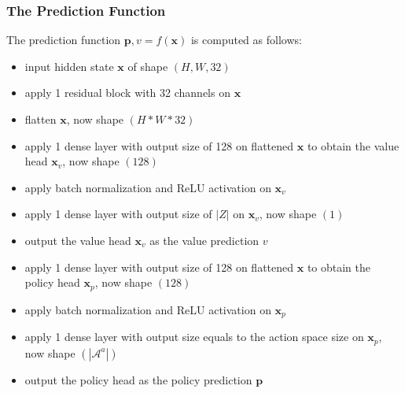 \subsubsection{The Prediction Function}
The prediction function $\mathbf{p}, v = f(\mathbf{x})$ is computed as follows:
\begin{itemize}
    \item input hidden state $\mathbf{x}$ of shape $(H, W, 32)$
    \item apply 1 residual block with 32 channels on $\mathbf{x}$
    \item flatten $\mathbf{x}$, now shape $(H * W * 32)$
    \item apply 1 dense layer with output size of 128 on flattened $\mathbf{x}$ to obtain the value head $\mathbf{x}_v$, now shape $(128)$
    \item apply batch normalization and ReLU activation on $\mathbf{x}_v$
    \item apply 1 dense layer with output size of $|Z|$ on $\mathbf{x}_v$, now shape $(1)$
    \item output the value head $\mathbf{x}_v$ as the value prediction $v$
    \item apply 1 dense layer with output size of 128 on flattened $\mathbf{x}$ to obtain the policy head $\mathbf{x}_p$, now shape $(128)$
    \item apply batch normalization and ReLU activation on $\mathbf{x}_p$
    \item apply 1 dense layer with output size equals to the action space size on $\mathbf{x}_p$, now shape $(|\mathcal{A}^a|)$
    \item output the policy head as the policy prediction $\mathbf{p}$
\end{itemize}

